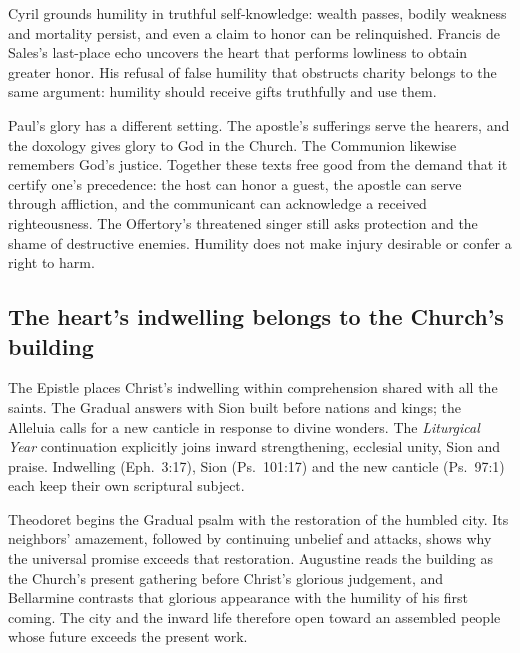 Cyril grounds humility in truthful self-knowledge: wealth passes, bodily weakness and mortality persist, and even a claim to honor can be relinquished. Francis de Sales's last-place echo uncovers the heart that performs lowliness to obtain greater honor. His refusal of false humility that obstructs charity belongs to the same argument: humility should receive gifts truthfully and use them. 

Paul's glory has a different setting. The apostle's sufferings serve the hearers, and the doxology gives glory to God in the Church. The Communion likewise remembers God's justice. Together these texts free good from the demand that it certify one's precedence: the host can honor a guest, the apostle can serve through affliction, and the communicant can acknowledge a received righteousness. The Offertory's threatened singer still asks protection and the shame of destructive enemies. Humility does not make injury desirable or confer a right to harm. 

\subsection*{The heart's indwelling belongs to the Church's building}
The Epistle places Christ's indwelling within comprehension shared with all the saints. The Gradual answers with Sion built before nations and kings; the Alleluia calls for a new canticle in response to divine wonders. The \textit{Liturgical Year} continuation explicitly joins inward strengthening, ecclesial unity, Sion and praise. Indwelling (Eph.~3:17), Sion (Ps.~101:17) and the new canticle (Ps.~97:1) each keep their own scriptural subject. 

Theodoret begins the Gradual psalm with the restoration of the humbled city. Its neighbors' amazement, followed by continuing unbelief and attacks, shows why the universal promise exceeds that restoration. Augustine reads the building as the Church's present gathering before Christ's glorious judgement, and Bellarmine contrasts that glorious appearance with the humility of his first coming. The city and the inward life therefore open toward an assembled people whose future exceeds the present work. 

